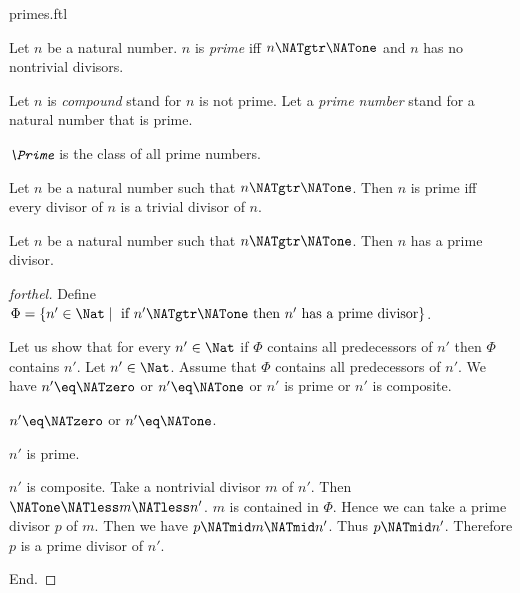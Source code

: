 \documentclass{naproche-library}
\begin{document}
\begin{smodule}[title=Prime Numbers]{primes.ftl}

\begin{definition}[forthel,id=ARITHMETIC_10_5450464558579712]
  Let $n$ be a natural number.
  $n$ is \emph{prime} iff $n \NATgtr \NATone$ and $n$ has no nontrivial divisors.

  Let $n$ is \emph{compound} stand for $n$ is not prime.
  Let a \emph{prime number} stand for a natural number that is prime.
\end{definition}

\begin{definition}[forthel,id=ARITHMETIC_10_3834705971511296]
  $\emph{\Prime}$ is the class of all prime numbers.
\end{definition}

\begin{proposition}[forthel,id=ARITHMETIC_10_7801379464675328]
  Let $n$ be a natural number such that $n \NATgtr \NATone$.
  Then $n$ is prime iff every divisor of $n$ is a trivial divisor of $n$.
\end{proposition}

\begin{proposition}[forthel,id=ARITHMETIC_10_3606185106210816]
  Let $n$ be a natural number such that $n \NATgtr \NATone$.
  Then $n$ has a prime divisor.
\end{proposition}
\begin{proof}[forthel]
  Define $\Phi = \{ n' \in \Nat \mid\text{ if }n' \NATgtr \NATone\text{ then }n'\text{ has a prime divisor}\}$.

  Let us show that for every $n' \in \Nat$ if $\Phi$ contains all
  predecessors of $n'$ then $\Phi$ contains $n'$.
    Let $n' \in \Nat$.
    Assume that $\Phi$ contains all predecessors of $n'$.
    We have $n' \eq \NATzero$ or $n' \eq \NATone$ or $n'$ is prime or $n'$ is composite.

    \begin{case}{$n' \eq \NATzero$ or $n' \eq \NATone$.} \end{case}

    \begin{case}{$n'$ is prime.} \end{case}

    \begin{case}{$n'$ is composite.}
      Take a nontrivial divisor $m$ of $n'$.
      Then $\NATone \NATless m \NATless n'$.
      $m$ is contained in $\Phi$.
      Hence we can take a prime divisor $p$ of $m$.
      Then we have $p \NATmid m \NATmid n'$.
      Thus $p \NATmid n'$.
      Therefore $p$ is a prime divisor of $n'$.
    \end{case}
  End.


\end{proof}
\end{smodule}
\end{document}
